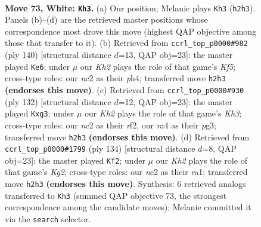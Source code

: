 \documentclass[11pt]{article}
\begin{document}
\clearpage

\begin{figure}[p]\centering
\begin{subfigure}{0.46\textwidth}\centering
\resizebox{\linewidth}{!}{%
\newchessgame
\chessboard[
  setfen={8/6R1/5B1k/8/r7/8/2n1bP1K/8 w - - 6 73},
  showmover=false,
  pgfstyle=straightmove, color=movearrow, markmove={h2-h3}
]}
\caption{}
\end{subfigure}\hfill
\begin{subfigure}{0.46\textwidth}\centering
\resizebox{\linewidth}{!}{%
\newchessgame
\chessboard[
  setfen={3k4/2R5/1r1B4/5K2/7p/8/8/8 w - - 4 71},
  showmover=false,
  pgfstyle=straightmove, color=movearrow, markmove={f5-e6}
]}
\caption{}
\end{subfigure}
\\[4pt]
\begin{subfigure}{0.46\textwidth}\centering
\resizebox{\linewidth}{!}{%
\newchessgame
\chessboard[
  setfen={8/2B5/3R4/2k4P/4b3/6pK/5r2/8 w - - 1 67},
  showmover=false,
  pgfstyle=straightmove, color=movearrow, markmove={h3-g3}
]}
\caption{}
\end{subfigure}\hfill
\begin{subfigure}{0.46\textwidth}\centering
\resizebox{\linewidth}{!}{%
\newchessgame
\chessboard[
  setfen={8/5k2/4R3/5B2/8/5P2/3b2K1/r7 w - - 1 68},
  showmover=false,
  pgfstyle=straightmove, color=movearrow, markmove={g2-f2}
]}
\caption{}
\end{subfigure}
\caption{\textbf{Move 73, White: \texttt{Kh3}.} (a) Our position; Melanie plays \texttt{Kh3} (\texttt{h2h3}). Panels (b)--(d) are the retrieved master positions whose correspondence most drove this move (highest QAP objective among those that transfer to it). (b) Retrieved from \texttt{ccrl\_top\_p0000\#982} (ply 140) [structural distance $d$=13, QAP obj=23]: the master played \texttt{Ke6}; under $\mu$ our \emph{Kh2} plays the role of that game's \emph{Kf5}; cross-type roles: our \emph{n}c2 as their \emph{p}h4; transferred move \texttt{h2h3} \textbf{(endorses this move)}. (c) Retrieved from \texttt{ccrl\_top\_p0000\#930} (ply 132) [structural distance $d$=12, QAP obj=23]: the master played \texttt{Kxg3}; under $\mu$ our \emph{Kh2} plays the role of that game's \emph{Kh3}; cross-type roles: our \emph{n}c2 as their \emph{r}f2, our \emph{r}a4 as their \emph{p}g3; transferred move \texttt{h2h3} \textbf{(endorses this move)}. (d) Retrieved from \texttt{ccrl\_top\_p0000\#1799} (ply 134) [structural distance $d$=8, QAP obj=23]: the master played \texttt{Kf2}; under $\mu$ our \emph{Kh2} plays the role of that game's \emph{Kg2}; cross-type roles: our \emph{n}c2 as their \emph{r}a1; transferred move \texttt{h2h3} \textbf{(endorses this move)}. Synthesis: 6 retrieved analogs transferred to \texttt{Kh3} (summed QAP objective 73, the strongest correspondence among the candidate moves); Melanie committed it via the \texttt{search} selector.}
\label{fig:thought-m144}
\end{figure}
\end{document}
